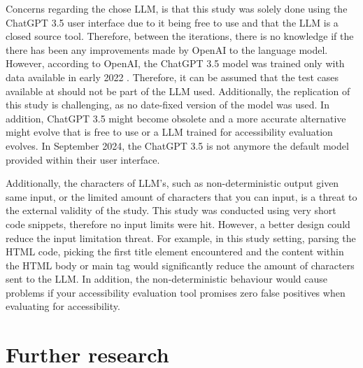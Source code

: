 Concerns regarding the chose LLM, is that this study was solely done using the ChatGPT 3.5 user interface due to it being free to use and that the LLM is a closed source tool. Therefore, between the iterations, there is no knowledge if the there has been any improvements made by OpenAI to the language model. However, according to OpenAI, the ChatGPT 3.5 model was trained only with data available in early 2022 \citep{openai_35}. Therefore, it can be assumed that the test cases available at \textcite{act_rule_g88} should not be part of the LLM used. Additionally, the replication of this study is challenging, as no date-fixed version of the model was used. In addition, ChatGPT 3.5 might become obsolete and a more accurate alternative might evolve that is free to use or a LLM trained for accessibility evaluation evolves. In September 2024, the ChatGPT 3.5 is not anymore the default model provided within their user interface.

Additionally, the characters of LLM's, such as non-deterministic output given same input, or the limited amount of characters that you can input, is a threat to the external validity of the study. This study was conducted using very short code snippets, therefore no input limits were hit. However, a better design could reduce the input limitation threat. For example, in this study setting, parsing the HTML code, picking the first title element encountered and the content within the HTML body or main tag would significantly reduce the amount of characters sent to the LLM. In addition, the non-deterministic behaviour would cause problems if your accessibility evaluation tool promises zero false positives when evaluating for accessibility.

\section{Further research}

